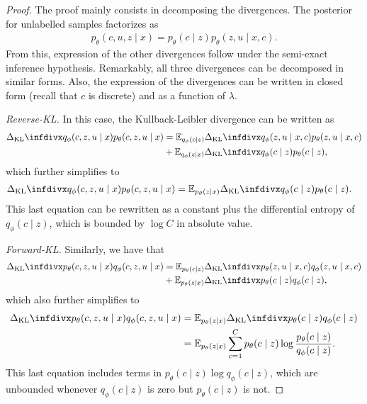 \begin{proof}
The proof mainly consists in decomposing the divergences. The posterior for unlabelled samples factorizes as
\begin{align}
    p_\theta(c, u, z \mid x) = p_\theta(c \mid z) p_\theta(z, u \mid x, c).
\end{align}
From this, expression of the other divergences follow under the semi-exact inference hypothesis. Remarkably, all three divergences can be decomposed in similar forms. Also, the expression of the divergences can be written in closed form (recall that $c$ is discrete) and as a function of $\lambda$.

\textit{Reverse-KL.} In this case, the Kullback-Leibler divergence can be written as
\begin{align}
    \kl{q_\phi(c, z, u \mid x)}{p_\theta(c, z, u \mid x)} &= \mathbb{E}_{q_\phi(c \mid z)} \kl{q_\phi(z, u \mid x, c)}{p_\theta(z, u\mid x, c)} \\
    &+\mathbb{E}_{q_\phi(z \mid x)} \kl{q_\phi(c \mid z)}{p_\theta(c \mid z)},
\end{align}
which further simplifies to 
\begin{align}
    \kl{q_\phi(c, z, u \mid x)}{p_\theta(c, z, u \mid x)} &= \mathbb{E}_{p_\theta(z \mid x)} \kl{q_\phi(c \mid z)}{p_\theta(c \mid z)}.
\end{align}
This last equation can be rewritten as a constant plus the differential entropy of $q_\phi(c \mid z)$, which is bounded by $\log C$ in absolute value.

\textit{Forward-KL.} Similarly, we have that
\begin{align}
    \kl{p_\theta(c, z, u \mid x)}{q_\phi(c, z, u \mid x)} &= \mathbb{E}_{p_\theta(c \mid z)} \kl{p_\theta(z, u\mid x, c)}{q_\phi(z, u \mid x, c)} \\
    &+\mathbb{E}_{p_\theta(z \mid x)} \kl{p_\theta(c \mid z)}{q_\phi(c \mid z)},
\end{align}
which also further simplifies to
\begin{align}
    \kl{p_\theta(c, z, u \mid x)}{q_\phi(c, z, u \mid x)} &= \mathbb{E}_{p_\theta(z \mid x)} \kl{p_\theta(c \mid z)}{q_\phi(c \mid z)} \\
    &= \mathbb{E}_{p_\theta(z \mid x)} \sum_{c=1}^C p_\theta(c \mid z) \log \frac{p_\theta(c \mid z)}{q_\phi(c \mid z)}.
\end{align}
This last equation includes terms in $p_\theta(c \mid z)\log q_\phi(c \mid z)$, which are unbounded whenever $q_\phi(c \mid z)$ is zero but $p_\theta(c \mid z)$ is not.


\end{proof}
